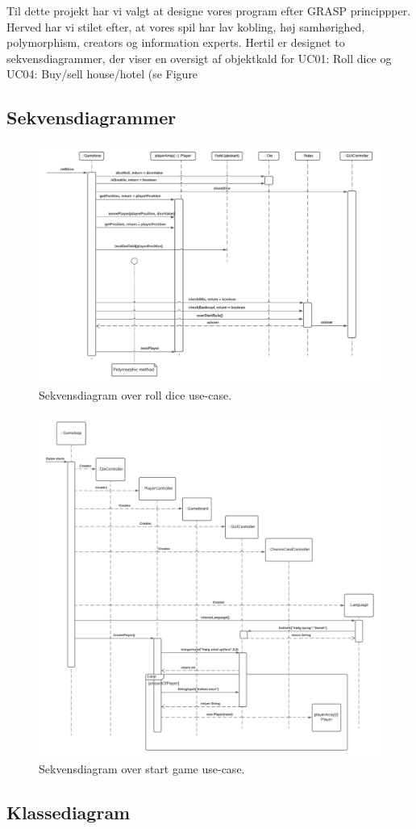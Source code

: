 \begin{flushleft}
\doublespacing
Til dette projekt har vi valgt at designe vores program efter GRASP princippper. Herved har vi stilet efter, at vores spil har lav kobling, høj samhørighed, polymorphism, creators og information experts. Hertil er designet to sekvensdiagrammer, der viser en oversigt af objektkald for UC01: Roll dice og UC04: Buy/sell house/hotel (se Figure 
\subsection{Sekvensdiagrammer}

\begin{figure}[htp]
    \centering
    \includegraphics[width=13cm]{Report/figures/Roll Dice Sekvensdiagram.png}
    \caption{Sekvensdiagram over roll dice use-case.}
\end{figure}
\begin{figure}[htp]
    \centering
    \includegraphics[width=13cm]{Report/figures/Start Game Sekvensdiagram.png}
    \caption{Sekvensdiagram over start game use-case.}
\end{figure}

\subsection{Klassediagram}

\end{flushleft}